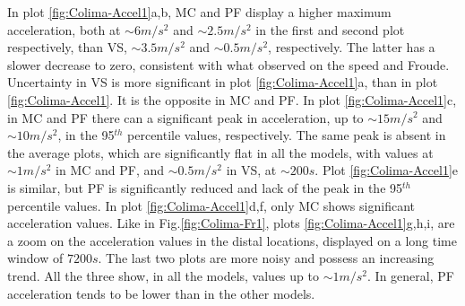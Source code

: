 \documentclass{article}
\begin{document}
In plot \ref{fig:Colima-Accel1}a,b, MC and PF display a higher maximum acceleration, both at $\sim 6 m/s^2$ and $\sim 2.5 m/s^2$ in the first and second plot respectively, than VS, $\sim 3.5 m/s^2$ and $\sim 0.5 m/s^2$, respectively. The latter has a slower decrease to zero, consistent with what observed on the speed and Froude. Uncertainty in VS is more significant in plot \ref{fig:Colima-Accel1}a, than in plot \ref{fig:Colima-Accel1}. It is the opposite in MC and PF. In plot \ref{fig:Colima-Accel1}c, in MC and PF there can a significant peak in acceleration, up to $\sim 15 m/s^2$ and $\sim 10 m/s^2$, in the 95$^{th}$ percentile values, respectively. The same peak is absent in the average plots, which are significantly flat in all the models, with values at $\sim 1 m/s^2$ in MC and PF, and $\sim 0.5 m/s^2$ in VS, at $\sim 200 s$. Plot \ref{fig:Colima-Accel1}e is similar, but PF is significantly reduced and lack of the peak in the 95$^{th}$ percentile values. In plot \ref{fig:Colima-Accel1}d,f, only MC shows significant acceleration values. Like in Fig.\ref{fig:Colima-Fr1}, plots \ref{fig:Colima-Accel1}g,h,i, are a zoom on the acceleration values in the distal locations, displayed on a long time window of $7200 s$. The last two plots are more noisy and possess an increasing trend. All the three show, in all the models, values up to $\sim 1 m/s^2$. In general, PF acceleration tends to be lower than in the other models.
\end{document}
